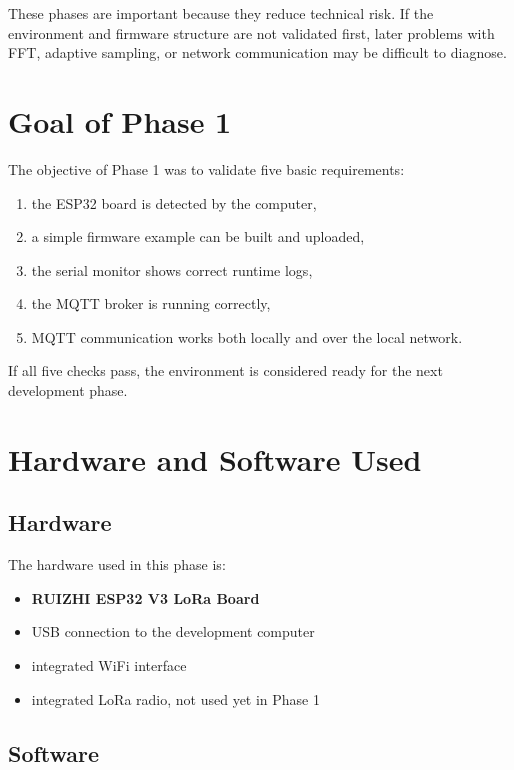\documentclass[12pt,a4paper]{article}
\begin{document}
These phases are important because they reduce technical risk. If the
environment and firmware structure are not validated first, later problems with
FFT, adaptive sampling, or network communication may be difficult to diagnose.

\section{Goal of Phase 1}

The objective of Phase 1 was to validate five basic requirements:

\begin{enumerate}[label=\arabic*.]
    \item the ESP32 board is detected by the computer,
    \item a simple firmware example can be built and uploaded,
    \item the serial monitor shows correct runtime logs,
    \item the MQTT broker is running correctly,
    \item MQTT communication works both locally and over the local network.
\end{enumerate}

If all five checks pass, the environment is considered ready for the next
development phase.

\section{Hardware and Software Used}

\subsection{Hardware}

The hardware used in this phase is:

\begin{itemize}
    \item \textbf{RUIZHI ESP32 V3 LoRa Board}
    \item USB connection to the development computer
    \item integrated WiFi interface
    \item integrated LoRa radio, not used yet in Phase 1
\end{itemize}

\subsection{Software}
\end{document}
